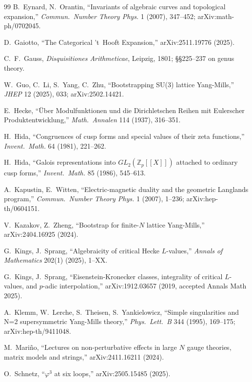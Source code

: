 \documentclass[11pt]{amsart}
\theoremstyle{definition}
\theoremstyle{remark}
\newcommand{\Z}{\mathbb{Z}}
\begin{document}
\begin{thebibliography}{99}
 B.~Eynard, N.~Orantin, ``Invariants of algebraic curves and topological expansion,'' \emph{Commun.\ Number Theory Phys.} 1 (2007), 347--452; arXiv:math-ph/0702045.

 D.~Gaiotto, ``The Categorical 't~Hooft Expansion,'' arXiv:2511.19776 (2025).

 C.~F.~Gauss, \emph{Disquisitiones Arithmeticae}, Leipzig, 1801; \S\S 225--237 on genus theory.

 W.~Guo, C.~Li, S.~Yang, C.~Zhu, ``Bootstrapping SU(3) lattice Yang-Mills,'' \emph{JHEP} 12 (2025), 033; arXiv:2502.14421.

 E.~Hecke, ``\"Uber Modulfunktionen und die Dirichletschen Reihen mit Eulerscher Produktentwicklung,'' \emph{Math.\ Annalen} 114 (1937), 316--351.

 H.~Hida, ``Congruences of cusp forms and special values of their zeta functions,'' \emph{Invent.\ Math.} 64 (1981), 221--262.

 H.~Hida, ``Galois representations into $GL_2(\Z_p[[X]])$ attached to ordinary cusp forms,'' \emph{Invent.\ Math.} 85 (1986), 545--613.

 A.~Kapustin, E.~Witten, ``Electric-magnetic duality and the geometric Langlands program,'' \emph{Commun.\ Number Theory Phys.} 1 (2007), 1--236; arXiv:hep-th/0604151.

 V.~Kazakov, Z.~Zheng, ``Bootstrap for finite-$N$ lattice Yang-Mills,'' arXiv:2404.16925 (2024).

 G.~Kings, J.~Sprang, ``Algebraicity of critical Hecke $L$-values,'' \emph{Annals of Mathematics} 202(1) (2025), 1--XX.

 G.~Kings, J.~Sprang, ``Eisenstein-Kronecker classes, integrality of critical $L$-values, and $p$-adic interpolation,'' arXiv:1912.03657 (2019, accepted Annals Math 2025).

 A.~Klemm, W.~Lerche, S.~Theisen, S.~Yankielowicz, ``Simple singularities and N=2 supersymmetric Yang-Mills theory,'' \emph{Phys.\ Lett.\ B} 344 (1995), 169--175; arXiv:hep-th/9411048.

 M.~Mari\~no, ``Lectures on non-perturbative effects in large $N$ gauge theories, matrix models and strings,'' arXiv:2411.16211 (2024).

 O.~Schnetz, ``$\varphi^3$ at six loops,'' arXiv:2505.15485 (2025).


\end{thebibliography}
\end{document}
